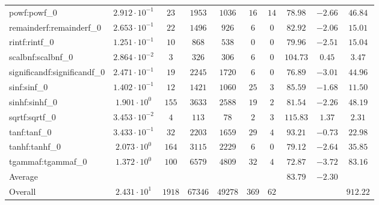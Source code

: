 \begin{tabular}{|l|c|c|c|c|c|c|c|c|c|}
powf:powf\_0                 & $ 2.912 \cdot 10^{-1} $ & $ 23     $ & $ 1953  $ & $ 1036  $ & $ 16  $ & $ 14 $ & $ 78.98       $ & $ -2.66   $ & $ 46.84   $ \\
remainderf:remainderf\_0     & $ 2.653 \cdot 10^{-1} $ & $ 22     $ & $ 1496  $ & $ 926   $ & $ 6   $ & $ 0  $ & $ 82.92       $ & $ -2.06   $ & $ 15.01   $ \\
rintf:rintf\_0               & $ 1.251 \cdot 10^{-1} $ & $ 10     $ & $ 868   $ & $ 538   $ & $ 0   $ & $ 0  $ & $ 79.96       $ & $ -2.51   $ & $ 15.04   $ \\
scalbnf:scalbnf\_0           & $ 2.864 \cdot 10^{-2} $ & $ 3      $ & $ 326   $ & $ 306   $ & $ 6   $ & $ 0  $ & $ 104.73      $ & $ 0.45    $ & $ 3.47    $ \\
significandf:significandf\_0 & $ 2.471 \cdot 10^{-1} $ & $ 19     $ & $ 2245  $ & $ 1720  $ & $ 6   $ & $ 0  $ & $ 76.89       $ & $ -3.01   $ & $ 44.96   $ \\
sinf:sinf\_0                 & $ 1.402 \cdot 10^{-1} $ & $ 12     $ & $ 1421  $ & $ 1060  $ & $ 25  $ & $ 3  $ & $ 85.59       $ & $ -1.68   $ & $ 11.50   $ \\
sinhf:sinhf\_0               & $ 1.901 \cdot 10^{0}  $ & $ 155    $ & $ 3633  $ & $ 2588  $ & $ 19  $ & $ 2  $ & $ 81.54       $ & $ -2.26   $ & $ 48.19   $ \\
sqrtf:sqrtf\_0               & $ 3.453 \cdot 10^{-2} $ & $ 4      $ & $ 113   $ & $ 78    $ & $ 2   $ & $ 3  $ & $ 115.83      $ & $ 1.37    $ & $ 2.31    $ \\
tanf:tanf\_0                 & $ 3.433 \cdot 10^{-1} $ & $ 32     $ & $ 2203  $ & $ 1659  $ & $ 29  $ & $ 4  $ & $ 93.21       $ & $ -0.73   $ & $ 22.98   $ \\
tanhf:tanhf\_0               & $ 2.073 \cdot 10^{0}  $ & $ 164    $ & $ 3115  $ & $ 2229  $ & $ 6   $ & $ 0  $ & $ 79.12       $ & $ -2.64   $ & $ 35.85   $ \\
tgammaf:tgammaf\_0           & $ 1.372 \cdot 10^{0}  $ & $ 100    $ & $ 6579  $ & $ 4809  $ & $ 32  $ & $ 4  $ & $ 72.87       $ & $ -3.72   $ & $ 83.16   $ \\
\hline
Average                      & $                     $ & $        $ & $       $ & $       $ & $     $ & $    $ & $ 83.79       $ & $ -2.30   $ & $         $ \\
\hline
Overall                      & $ 2.431 \cdot 10^{1}  $ & $ 1918   $ & $ 67346 $ & $ 49278 $ & $ 369 $ & $ 62 $ & $             $ & $         $ & $ 912.22  $ \\
\hline
\end{tabular}
